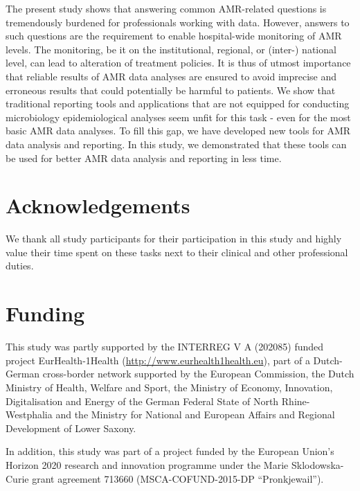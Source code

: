 \documentclass[
]{book}
\begin{document}
The present study shows that answering common AMR-related questions is tremendously burdened for professionals working with data. However, answers to such questions are the requirement to enable hospital-wide monitoring of AMR levels. The monitoring, be it on the institutional, regional, or (inter-) national level, can lead to alteration of treatment policies. It is thus of utmost importance that reliable results of AMR data analyses are ensured to avoid imprecise and erroneous results that could potentially be harmful to patients. We show that traditional reporting tools and applications that are not equipped for conducting microbiology epidemiological analyses seem unfit for this task - even for the most basic AMR data analyses. To fill this gap, we have developed new tools for AMR data analysis and reporting. In this study, we demonstrated that these tools can be used for better AMR data analysis and reporting in less time.

\hypertarget{acknowledgements-2}{%
\section*{Acknowledgements}\label{acknowledgements-2}}

We thank all study participants for their participation in this study and highly value their time spent on these tasks next to their clinical and other professional duties.

\hypertarget{funding}{%
\section*{Funding}\label{funding}}

This study was partly supported by the INTERREG V A (202085) funded project EurHealth-1Health (\url{http://www.eurhealth1health.eu}), part of a Dutch-German cross-border network supported by the European Commission, the Dutch Ministry of Health, Welfare and Sport, the Ministry of Economy, Innovation, Digitalisation and Energy of the German Federal State of North Rhine-Westphalia and the Ministry for National and European Affairs and Regional Development of Lower Saxony.

In addition, this study was part of a project funded by the European Union's Horizon 2020 research and innovation programme under the Marie Sklodowska-Curie grant agreement 713660 (MSCA-COFUND-2015-DP ``Pronkjewail'').
\end{document}
